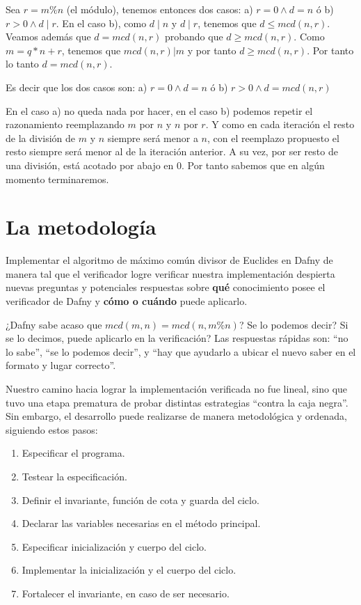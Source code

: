 \documentclass[12pt, a4paper, openany, fleqn]{book}
\begin{document}
    Sea $r = m \% n$ (el módulo), tenemos entonces dos casos: a) $r = 0 \land d = n$ ó b) $r > 0 \land d \mid r $. En el caso b), como $d \mid n$ y $d \mid r$, tenemos que $d \leq mcd(n, r)$. Veamos además que $d = mcd(n,r)$ probando que $d \geqslant mcd(n,r)$. Como $m = q * n + r$, tenemos que $mcd(n, r) | m$ y por tanto $d \geqslant mcd(n,r)$. Por tanto lo tanto $d = mcd(n,r)$.

    Es decir que los dos casos son: a) $r = 0 \land d = n$ ó b) $r > 0 \land d = mcd(n, r) $

    En el caso a) no queda nada por hacer, en el caso b) podemos repetir el razonamiento reemplazando $m$ por $n$ y $n$ por $r$. Y como en cada iteración el resto de la división de $m$ y $n$ siempre será menor a $n$, con el reemplazo propuesto el resto siempre será menor al de la iteración anterior. A su vez, por ser resto de una división, está acotado por abajo en $0$. Por tanto sabemos que en algún momento terminaremos.

    \section{La metodología}
    Implementar el algoritmo de máximo común divisor de Euclides en Dafny de manera tal que el verificador logre verificar nuestra implementación despierta nuevas preguntas y potenciales respuestas sobre \textbf{qué} conocimiento posee el verificador de Dafny y \textbf{cómo o cuándo} puede aplicarlo.

    ¿Dafny sabe acaso que $mcd(m, n) = mcd(n, m\%n)$? Se lo podemos decir? Si se lo decimos, puede aplicarlo en la verificación?
    Las respuestas rápidas son: ``no lo sabe'', ``se lo podemos decir'', y ``hay que ayudarlo a ubicar el nuevo saber en el formato y lugar correcto''.

    Nuestro camino hacia lograr la implementación verificada no fue lineal, sino que tuvo una etapa prematura de probar distintas estrategias ``contra la caja negra''. Sin embargo, el desarrollo puede realizarse de manera metodológica y ordenada, siguiendo estos pasos:
    \begin{enumerate}
        \item Especificar el programa.
        \item Testear la especificación.
        \item Definir el invariante, función de cota y guarda del ciclo.
        \item Declarar las variables necesarias en el método principal.
        \item Especificar inicialización y cuerpo del ciclo.
        \item Implementar la inicialización y el cuerpo del ciclo.
        \item Fortalecer el invariante, en caso de ser necesario.
    \end{enumerate}
\end{document}
